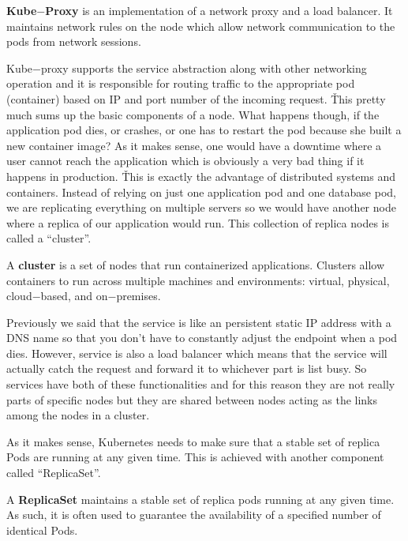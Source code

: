 \textbf{Kube$-$Proxy} is an implementation of a network proxy and a load balancer. It maintains network rules on the
node which allow network communication to the pods from network sessions.
\ed


Kube$-$proxy supports the service abstraction along with other networking operation and it is responsible for routing
traffic to the appropriate pod (container) based on IP and port number of the incoming request. \v

This pretty much sums up the basic components of a node. What happens though, if the application pod dies, or
crashes, or one has to restart the pod because she built a new container image? As it makes sense, one would have a
downtime where a user cannot reach the application which is obviously a very bad thing if it happens in production. \v

This is exactly the advantage of distributed systems and containers. Instead of relying on just one application pod
and one database pod, we are replicating everything on multiple servers so we would have another node where a replica
of our application would run. This collection of replica nodes is called a ``cluster''.

\bd[Cluster]
A \textbf{cluster} is a set of nodes that run containerized applications. Clusters allow containers to run across
multiple machines and environments: virtual, physical, cloud$-$based, and on$-$premises.
\ed

Previously we said that the service is like an persistent static IP address with a DNS name so that you don't have to
constantly adjust the endpoint when a pod dies. However, service is also a load balancer which means that the service
will actually catch the request and forward it to whichever part is list busy. So services have both of these
functionalities and for this reason they are not really parts of specific nodes but they are shared between nodes
acting as the links among the nodes in a cluster.


As it makes sense, Kubernetes needs to make sure that a stable set of replica Pods are running at any given time.
This is achieved with another component called ``ReplicaSet''.

\bd[ReplicaSet]
A \textbf{ReplicaSet} maintains a stable set of replica pods running at any given time. As such, it is often used to
guarantee the availability of a specified number of identical Pods.
\ed

